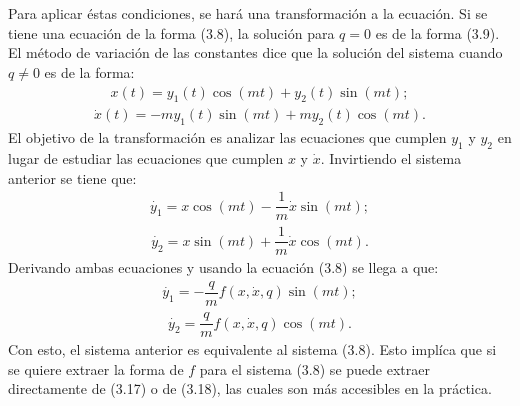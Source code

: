 \\
\\
Para aplicar éstas condiciones, se hará una transformación a la ecuación. Si se tiene una ecuación de la forma (3.8), la solución para $q=0$ es de la forma (3.9). El método de variación de las constantes dice que la solución del sistema cuando $q\neq 0$ es de la forma:
\begin{eqnarray}
x(t)=y_{1}(t)\cos(mt)+y_{2}(t)\sin(mt);
\end{eqnarray}
\begin{eqnarray}
\dot{x}(t)=-my_{1}(t)\sin(mt)+my_{2}(t)\cos(mt).
\end{eqnarray}
El objetivo de la transformación es analizar las ecuaciones que cumplen $y_{1}$ y $y_{2}$ en lugar de estudiar las ecuaciones que cumplen $x$ y $\dot{x}$. Invirtiendo el sistema anterior se tiene que:
\begin{eqnarray}
\dot{y_{1}}=x\cos(mt)-\dfrac{1}{m}\dot{x}\sin(mt);
\end{eqnarray}
\begin{eqnarray}
\dot{y_{2}}=x\sin(mt)+\dfrac{1}{m}\dot{x}\cos(mt).
\end{eqnarray}
Derivando ambas ecuaciones y usando la ecuación (3.8) se llega a que:
\begin{eqnarray}
\dot{y_{1}}=-\dfrac{q}{m}f(x,\dot{x},q)\sin(mt);
\end{eqnarray}
\begin{eqnarray}
\dot{y_{2}}=\dfrac{q}{m}f(x,\dot{x},q)\cos(mt).
\end{eqnarray}
Con esto, el sistema anterior es equivalente al sistema (3.8). Esto implíca que si se quiere extraer la forma de $f$ para el sistema (3.8) se puede extraer directamente de (3.17) o de (3.18), las cuales son más accesibles en la práctica.
